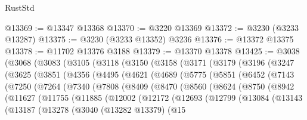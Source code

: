 \begin{lexlean}{RustStd}
\begin{coremodule}
{\begin{coremodule}
{{{{{{{{{{{{{{{{{{{{{{{{{{{{{{{{{{{{{@13369 := @13347 @13368
@13370 := @3220 @13369
@13372 := @3230 (@3233 @13287)
@13375 := @3230 (@3233 @13352) @3236
@13376 := @13372 @13375
@13378 := @11702 @13376 @3188
@13379 := @13370 @13378
@13425 := @3038
    (@3068
      (@3083
        (@3105
          (@3118
            (@3150
              (@3158
                (@3171
                  (@3179
                    (@3196
                      (@3247
                        (@3625
                          (@3851
                            (@4356
                              (@4495
                                (@4621
                                  (@4689
                                    (@5775
                                      (@5851
                                        (@6452
                                          (@7143
                                            (@7250
                                              (@7264
                                                (@7340
                                                  (@7808
                                                    (@8409
                                                      (@8470
                                                        (@8560
                                                          (@8624
                                                            (@8750
                                                              (@8942
                                                                (@11627
                                                                  (@11755
                                                                    (@11885
                                                                      (@12002
                                                                        (@12172
                                                                          (@12693
                                                                            (@12799
                                                                              (@13084
                                                                                (@13143
                                                                                  (@13187
                                                                                    (@13278
                                                                                      (@3040
                                                                                        (@13282
                                                                                          @13379)
                                                                                        (@15
}}}}}}}}}}}}}}}}}}}}}}}}}}}}}}}}}}}}}
\end{coremodule}}
\end{coremodule}
\end{lexlean}
